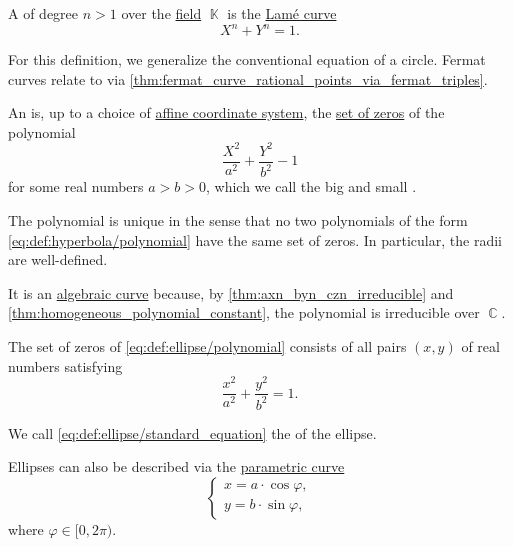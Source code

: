 \begin{definition}\label{def:fermat_curve}\mimprovised
  A  of degree \( n > 1 \) over the \hyperref[def:field]{field} \( \BbbK \) is the \hyperref[def:lame_curve]{Lam\'e curve}
  \begin{equation}\label{eq:def:fermat_curve}
    X^n + Y^n = 1.
  \end{equation}
\end{definition}
\begin{comments}
  \item For this definition, we generalize the conventional equation of a circle. Fermat curves relate to  via \cref{thm:fermat_curve_rational_points_via_fermat_triples}.
\end{comments}

\begin{definition}\label{def:ellipse}
  An  is, up to a choice of \hyperref[def:affine_coordinate_system]{affine coordinate system}, the \hyperref[def:polynomial_root]{set of zeros} of the polynomial
  \begin{equation}\label{eq:def:ellipse/polynomial}
    \frac {X^2} {a^2} + \frac {Y^2} {b^2} - 1
  \end{equation}
  for some real numbers \( a > b > 0 \), which we call the big and small .

  The polynomial is unique in the sense that no two polynomials of the form \eqref{eq:def:hyperbola/polynomial} have the same set of zeros. In particular, the radii are well-defined.

  It is an \hyperref[def:affine_algebraic_set/curve]{algebraic curve} because, by \cref{thm:axn_byn_czn_irreducible} and \cref{thm:homogeneous_polynomial_constant}, the polynomial is irreducible over \( \BbbC \).

  \begin{thmenum}
     The set of zeros of \eqref{eq:def:ellipse/polynomial} consists of all pairs \( (x, y) \) of real numbers satisfying
    \begin{equation}\label{eq:def:ellipse/standard_equation}
      \frac {x^2} {a^2} + \frac {y^2} {b^2} = 1.
    \end{equation}

    We call \eqref{eq:def:ellipse/standard_equation} the  of the ellipse.

     Ellipses can also be described via the \hyperref[def:parametric_curve]{parametric curve}
    \begin{equation}\label{eq:def:ellipse/parametric_equation}
      \begin{cases}
        x = a \cdot \cos \varphi, \\
        y = b \cdot \sin \varphi,
      \end{cases}
    \end{equation}
    where \( \varphi \in [0, 2\pi) \).
  \end{thmenum}


\end{definition}
